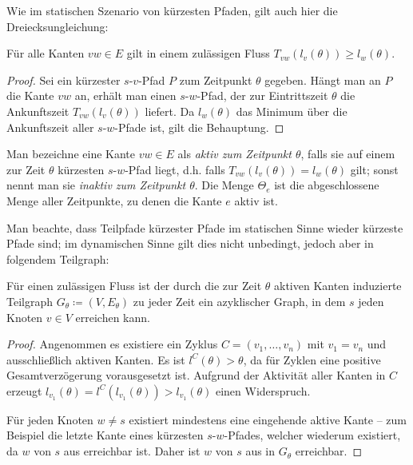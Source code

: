 Wie im statischen Szenario von kürzesten Pfaden, gilt auch hier die Dreiecksungleichung: 

\begin{lemma}\label{lemma-dreicksungl}
	Für alle Kanten $vw\in E$ gilt in einem zulässigen Fluss 
	$T_{vw}(l_v(\theta)) \geq l_w(\theta)$.
\end{lemma}
\begin{proof}
	Sei ein kürzester $s$-$v$-Pfad $P$ zum Zeitpunkt $\theta$ gegeben.
	Hängt man an $P$ die Kante $vw$ an, erhält man einen $s$-$w$-Pfad, der zur Eintrittszeit $\theta$ die Ankunftszeit $T_{vw}(l_v(\theta))$ liefert.
	Da $l_w(\theta)$ das Minimum über die Ankunftszeit aller $s$-$w$-Pfade ist, gilt die Behauptung.
\end{proof}

\begin{definition}
	Man bezeichne eine Kante $vw\in E$ als \emph{aktiv zum Zeitpunkt $\theta$}, falls sie auf einem zur Zeit $\theta$ kürzesten $s$-$w$-Pfad liegt, d.h. falls $T_{vw}(l_v(\theta)) = l_w(\theta)$ gilt; sonst nennt man sie \emph{inaktiv zum Zeitpunkt $\theta$}.
	Die Menge $\Theta_e$ ist die abgeschlossene Menge aller Zeitpunkte, zu denen die Kante $e$ aktiv ist.
\end{definition}

Man beachte, dass Teilpfade kürzester Pfade im statischen Sinne wieder kürzeste Pfade sind; im dynamischen Sinne gilt dies nicht unbedingt, jedoch aber in folgendem Teilgraph:

\begin{lemma}\label{lemma-shortest-path-using-active-edges}
	Für einen zulässigen Fluss ist der durch die zur Zeit $\theta$ aktiven Kanten induzierte Teilgraph $G_\theta\coloneq (V, E_\theta)$ zu jeder Zeit ein azyklischer Graph, in dem $s$ jeden Knoten $v\in V$ erreichen kann.
\end{lemma}
\begin{proof}
	Angenommen es existiere ein Zyklus $C=(v_1, \dots, v_n)$ mit $v_1=v_n$ und ausschließlich aktiven Kanten.
	Es ist $l^C(\theta) > \theta$, da für Zyklen eine positive Gesamtverzögerung vorausgesetzt ist.
	Aufgrund der Aktivität aller Kanten in $C$ erzeugt $l_{v_1}(\theta) = l^C(l_{v_1}(\theta)) > l_{v_1}(\theta)$ einen Widerspruch.
	
	Für jeden Knoten $w\neq s$ existiert mindestens eine eingehende aktive Kante -- zum Beispiel die letzte Kante eines kürzesten $s$-$w$-Pfades, welcher wiederum existiert, da $w$ von $s$ aus erreichbar ist.
	Daher ist $w$ von $s$ aus in $G_\theta$ erreichbar.
\end{proof}

